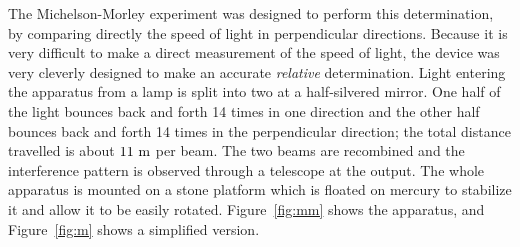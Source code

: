 The Michelson-Morley experiment was designed to perform this
determination, by comparing directly the speed of light in
perpendicular directions.  Because it is very difficult to make a
direct measurement of the speed of light, the device was very cleverly
designed to make an accurate {\em relative\/} determination.  Light
entering the apparatus from a lamp is split into two at a
half-silvered mirror.  One half of the light bounces back and forth 14
times in one direction and the other half bounces back and forth 14
times in the perpendicular direction; the total distance travelled is
about $11~{\rm m}$ per beam.  The two beams are recombined and the
interference pattern is observed through a telescope at the output.
The whole apparatus is mounted on a stone platform which is floated on
mercury to stabilize it and allow it to be easily rotated.
Figure~\ref{fig:mm} shows the apparatus, and Figure~\ref{fig:m} shows
a simplified version.

